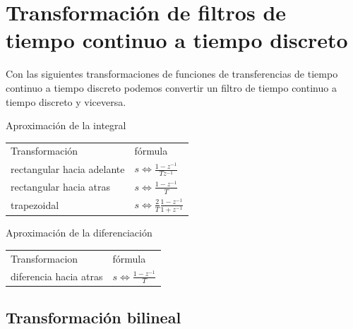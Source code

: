 \section{Transformaci\'{o}n de filtros de tiempo continuo a tiempo discreto}

Con las siguientes transformaciones de funciones de transferencias de tiempo continuo a tiempo 
discreto podemos convertir un filtro de tiempo continuo a tiempo discreto y viceversa.

\begin{center}
Aproximaci\'{o}n de la integral

\begin{tabular}{ll}
Transformaci\'{o}n & f\'{o}rmula \\
rectangular hacia adelante & $s\Leftrightarrow \frac{1-z^{-1}}{Tz^{-1}}$ \label{adelante} \\
rectangular hacia atras & $s\Leftrightarrow \frac{1-z^{-1}}{T}$ \label{atras}\\
trapezoidal & $s\Leftrightarrow \frac{2}{T}\frac{1-z^{-1}}{1+z^{-1}}$ \label{trapezoidal}
\end{tabular}
\end{center}

\begin{center}
Aproximaci\'{o}n de la diferenciaci\'{o}n

\begin{tabular}{ll}
Transformacion & f\'{o}rmula \\
diferencia hacia atras & $s\Leftrightarrow \frac{1-z^{-1}}{T}$
\end{tabular}
\end{center}

\subsection{Transformaci\'{o}n bilineal}

